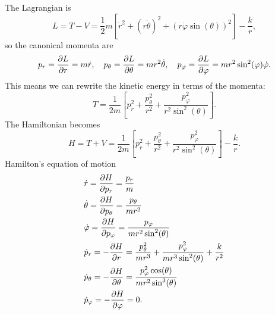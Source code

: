\documentclass{article}
\begin{document}
        The Lagrangian is 
        \begin{equation*}
            L = T - V = \frac{1}{2}m \left[\dot r^2 + (r \dot \theta)^2 + (r \dot \varphi \sin(\theta))^2\right] - \frac{k}{r},
        \end{equation*}
        so the canonical momenta are
        \begin{equation*}
            p_r = \pdv{L}{r} = m \dot r, \quad p_\theta = \pdv{L}{\theta} = m r^2 \dot \theta, \quad p_\varphi = \pdv{L}{\varphi} = m r^2 \sin^2(\varphi) \dot \varphi.
        \end{equation*}
        This means we can rewrite the kinetic energy in terms of the momenta:
        \begin{equation*}
            T = \frac{1}{2m} \left[p_r^2 +\frac{p^2_\theta}{r^2} + \frac{p^2_\varphi}{r^2 \sin^2(\theta)}\right].
        \end{equation*}
        The Hamiltonian becomes
        \begin{equation*}
            H = T + V = \frac{1}{2m} \left[p_r^2 +\frac{p^2_\theta}{r^2} + \frac{p^2_\varphi}{r^2 \sin^2(\theta)}\right] - \frac{k}{r}.
        \end{equation*}
        Hamilton's equation of motion
        \begin{align*}
            & \dot r = \pdv{H}{p_r} = \frac{p_r}{m} \\
            & \dot \theta = \pdv{H}{p_\theta} = \frac{p_\theta}{m r^2} \\
            & \dot \varphi = \pdv{H}{p_\varphi} = \frac{p_\varphi}{m r^2 \sin^2(\theta)} \\
            & \dot p_r = - \pdv{H}{r} = \frac{p^2_\theta}{m r^3} + \frac{p^2_\varphi}{m r^3 \sin^2(\theta)} + \frac{k}{r^2} \\
            & \dot p_\theta = - \pdv{H}{\theta} = \frac{p^2_\varphi \cos(\theta)}{m r^2 \sin^3(\theta)} \\
            & \dot p_\varphi = - \pdv{H}{\varphi} = 0.
        \end{align*}
\end{document}
